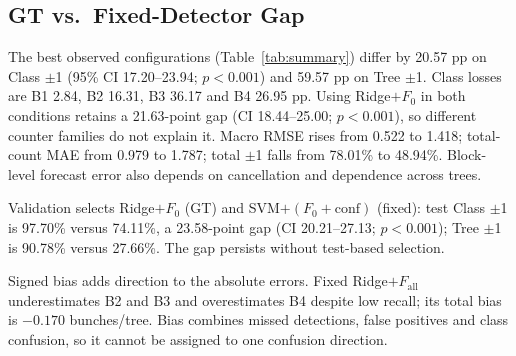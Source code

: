 \documentclass[conference,a4paper]{IEEEtran}
\begin{document}
\subsection{GT vs.\ Fixed-Detector Gap}
\label{sec:gap}
The best observed configurations (Table~\ref{tab:summary}) differ by 20.57 pp
on Class $\pm$1 (95\% CI 17.20--23.94; $p<0.001$) and 59.57 pp on Tree
$\pm$1. Class losses are B1 2.84, B2 16.31, B3 36.17 and B4 26.95 pp.
Using Ridge$+F_0$ in both conditions retains a 21.63-point gap
(CI 18.44--25.00; $p<0.001$), so different counter families do not explain it.
Macro RMSE rises from 0.522 to 1.418; total-count MAE from 0.979 to 1.787;
total $\pm$1 falls from 78.01\% to 48.94\%. Block-level forecast error also
depends on cancellation and dependence across trees.

Validation selects Ridge$+F_0$ (GT) and SVM$+(F_0+\mathrm{conf})$ (fixed):
test Class $\pm$1 is 97.70\% versus 74.11\%, a 23.58-point gap
(CI 20.21--27.13; $p<0.001$); Tree $\pm$1 is 90.78\% versus 27.66\%.
The gap persists without test-based selection.

Signed bias adds direction to the absolute errors. Fixed Ridge$+F_{\text{all}}$
underestimates B2 and B3 and overestimates B4 despite low recall; its total bias
is $-0.170$ bunches/tree. Bias combines missed detections, false positives and
class confusion, so it cannot be assigned to one confusion direction.
\end{document}
